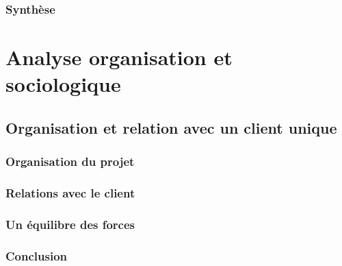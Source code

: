 \documentclass[twoside, 12pt]{report}
\begin{document}
    \section{Synthèse}

        

\part{Analyse organisation et sociologique}

\chapter{Organisation et relation avec un client unique}

    

    \section{Organisation du projet}

        
    
    \section{Relations avec le client}

        
    
    \section{Un équilibre des forces}

        


\cleardoublepage
\vfill

\section*{\textbf{Conclusion}}
\label{sect:Conclusion}




%
\end{document}
